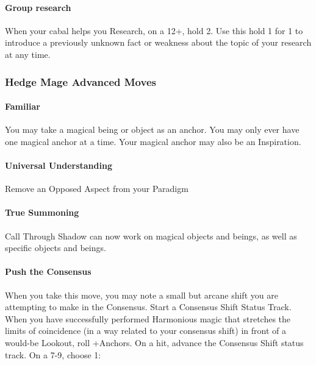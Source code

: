 \documentclass[
  oneside,
  statementpaper,
  9pt]{memoir}
\begin{document}
\hypertarget{group-research}{%
\paragraph{Group research}\label{group-research}}

When your cabal helps you Research, on a 12+, hold 2. Use this hold 1
for 1 to introduce a previously unknown fact or weakness about the topic
of your research at any time.

\hypertarget{hedge-mage-advanced-moves}{%
\subsubsection{Hedge Mage Advanced
Moves}\label{hedge-mage-advanced-moves}}

\hypertarget{familiar}{%
\paragraph{Familiar}\label{familiar}}

You may take a magical being or object as an anchor. You may only ever
have one magical anchor at a time. Your magical anchor may also be an
Inspiration.

\hypertarget{universal-understanding}{%
\paragraph{Universal Understanding}\label{universal-understanding}}

Remove an Opposed Aspect from your Paradigm

\hypertarget{true-summoning}{%
\paragraph{True Summoning}\label{true-summoning}}

Call Through Shadow can now work on magical objects and beings, as well
as specific objects and beings.

\hypertarget{push-the-consensus}{%
\paragraph{Push the Consensus}\label{push-the-consensus}}

When you take this move, you may note a small but arcane shift you are
attempting to make in the Consensus. Start a Consensus Shift Status
Track. When you have successfully performed Harmonious magic that
stretches the limits of coincidence (in a way related to your consensus
shift) in front of a would-be Lookout, roll +Anchors. On a hit, advance
the Consensus Shift status track. On a 7-9, choose 1:
\end{document}

